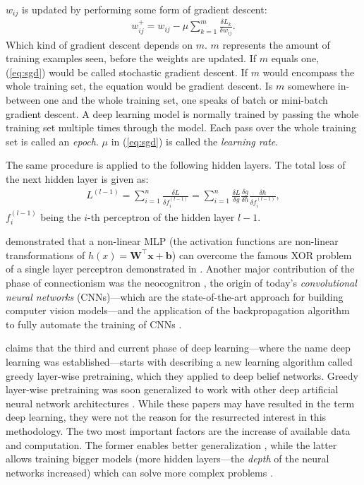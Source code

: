\documentclass[]{article}
\begin{document}
$w_{ij}$ is updated by performing some form of gradient descent:
\begin{align}
  \label{eq:sgd}
  w_{ij}^+ = w_{ij} - \mu \sum_{k=1}^{m} \frac{\delta L_k}{\delta w_{ij}}.
\end{align}
Which kind of gradient descent depends on $m$.
$m$ represents the amount of training examples seen, before the
weights are updated.
If $m$ equals one, (\ref{eq:sgd}) would be called stochastic gradient
descent.
If $m$ would encompass the whole training set, the equation would
be gradient descent.
Is $m$ somewhere in-between one and the whole training set, one
speaks of batch or mini-batch gradient descent.
A deep learning model is normally trained by passing the whole
training set multiple times through the model.
Each pass over the whole training set is called an \textit{epoch}.
$\mu$ in (\ref{eq:sgd}) is called the \textit{learning rate}.

The same procedure is applied to the following hidden layers.
The total loss of the next hidden layer is given as:
\begin{align}
  L^{(l-1)} = \sum_{i=1}^n\frac{\delta L}{\delta f^{(l - 1)}_i} =
  \sum_{i=1}^n\frac{\delta L}{\delta g}
    \frac{\delta g}{\delta h}
    \frac{\delta h}{\delta f^{(l - 1)}_i},
\end{align}
$f^{(l-1)}_i$ being the $i$-th perceptron of the hidden layer $l-1$.

\citet{hornik_et_al_1989} demonstrated that a non-linear MLP
(the activation functions are non-linear transformations of
$h(x) = \mathbf{W}^\top\mathbf{x} + \mathbf{b}$) can overcome the
famous XOR problem of a single layer perceptron demonstrated in
\citet{minsky_et_al_1969}.
Another major contribution of the phase of connectionism was the
neocognitron \citep{fukushima_1980}, the origin of today's
\textit{convolutional neural networks} (CNNs)---which are the
state-of-the-art approach for building computer vision models---and
the application of the backpropagation algorithm to fully automate the
training of CNNs \citep{lecun_et_al_1989}.

\citet{goodfellow_et_al_2016} claims that the third and current phase
of deep learning---where the name deep learning was
established---starts with \citet{hinton_et_al_2006} describing a new
learning algorithm called greedy layer-wise pretraining, which they
applied to deep belief networks.
Greedy layer-wise pretraining was soon generalized to work with other
deep artificial neural network architectures
\citep{renzato_et_al_2006, bengio_et_al_2007}.
While these papers may have resulted in the term deep learning,
they were not the reason for the resurrected interest in this
methodology.
The two most important factors are the increase of available data
and computation.
The former enables better generalization
\citep{goodfellow_et_al_2016}, while the latter allows
training bigger models (more hidden layers---the \textit{depth} of the
neural networks increased) which can solve more complex problems
\citep{bengio_et_al_2007a, goodfellow_et_al_2016}.
\end{document}
